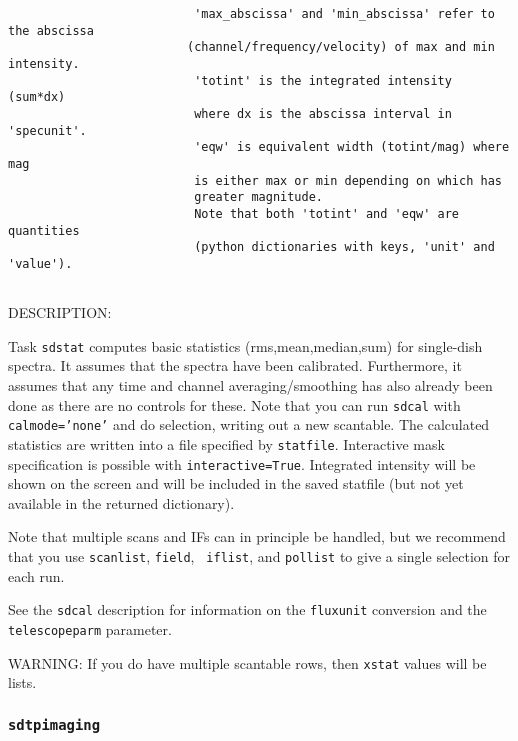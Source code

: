 \begin{verbatim}
                          'max_abscissa' and 'min_abscissa' refer to the abscissa
                         (channel/frequency/velocity) of max and min intensity.
                          'totint' is the integrated intensity (sum*dx)
                          where dx is the abscissa interval in 'specunit'.
                          'eqw' is equivalent width (totint/mag) where mag
                          is either max or min depending on which has
                          greater magnitude. 
                          Note that both 'totint' and 'eqw' are quantities
                          (python dictionaries with keys, 'unit' and 'value'). 


\end{verbatim}
    DESCRIPTION: 

     Task {\tt sdstat} computes basic statistics (rms,mean,median,sum)
     for single-dish spectra.  It assumes that the spectra have
     been calibrated.  Furthermore, it assumes that any
     time and channel averaging/smoothing has also already been done as
     there are no controls for these. Note that you can run {\tt sdcal}
     with {\tt calmode='none'} and do selection, writing out a new
     scantable.
     The calculated statistics are written into a file specified by
     {\tt statfile}.
     Interactive mask specification is possible with {\tt interactive=True}.
     Integrated intensity will be shown on the screen and will be included
     in the saved statfile (but not yet available in the returned dictionary).

     Note that multiple scans and IFs can in principle be handled, but
     we recommend that you use {\tt scanlist}, {\tt field}, {\tt
     iflist}, and {\tt pollist} to give a single selection for each run.

     See the {\tt sdcal} description for information on the {\tt fluxunit} 
     conversion and the {\tt telescopeparm} parameter.

     WARNING: If you do have multiple scantable rows, then {\tt xstat}
     values will be lists.


\subsubsection{{\tt sdtpimaging}}
\label{section:sd.sdtasks.tasks.sdtpimaging}

